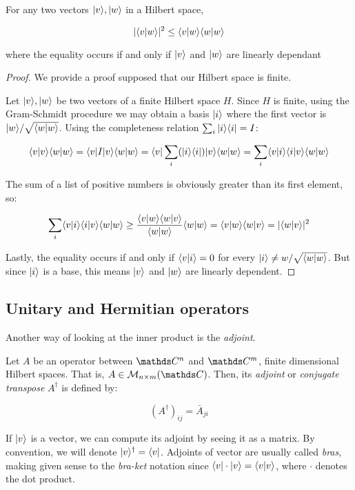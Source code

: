 \begin{corollary}
	For any two vectors $|v\rangle, |w\rangle$ in a Hilbert space,
	
	$$|\langle v|w\rangle|^2 \leq \langle v|w\rangle\langle w|w\rangle$$
	
	where the equality occurs if and only if $|v\rangle$ and $|w\rangle$ are linearly dependant
\end{corollary}
\begin{proof} 
	We provide a proof supposed that our Hilbert space is finite.
	
	Let $|v\rangle, |w\rangle$ be two vectors of a finite Hilbert space $H$. Since $H$ is finite, using the Gram-Schmidt procedure we may obtain a basis $|i\rangle$ where the first vector is $|w\rangle / \sqrt{\langle w|w\rangle}$. Using the completeness relation $\sum_i |i\rangle \langle i| = I$:
	
	$$\langle v|v\rangle \langle w|w\rangle = \langle v|I|v\rangle \langle w|w\rangle = \langle v| \sum_i (|i\rangle \langle i|) |v\rangle \langle w|w\rangle = \sum_i \langle v|i\rangle \langle i|v\rangle \langle w|w\rangle $$
	
	The sum of a list of positive numbers is obviously greater than its first element, so:
	
	$$ \sum_i \langle v|i\rangle \langle i|v\rangle \langle w|w\rangle \geq  \frac{\langle v|w\rangle \langle w|v\rangle}{\langle w|w\rangle} \langle w|w\rangle = \langle v|w\rangle \langle w|v\rangle  = | \langle w|v\rangle |^2 $$
	
	Lastly, the equality occurs if and only if $\langle v|i\rangle = 0$ for every $|i\rangle \neq w / \sqrt{\langle w|w\rangle}$. But since $|i\rangle$ is a base, this means $|v\rangle$ and $|w\rangle$ are linearly dependent.	
\end{proof}


\subsection{Unitary and Hermitian operators}


Another way of looking at the inner product is the \emph{adjoint}.

\begin{definition}
	Let $A$ be an operator between $\C^n$ and $\C^m$, finite dimensional Hilbert spaces. That is, $A \in \mathcal{M}_{n{\times}m}(\C)$. Then, its \emph{adjoint} or \emph{conjugate transpose} $A^\dagger$ is defined by:
	
	$$ (A^\dagger)_{ij} = \bar A_{ji} $$
\end{definition}

If $|v\rangle$ is a vector, we can compute its adjoint by seeing it as a matrix. By convention, we will denote $|v\rangle^\dagger = \langle v|$. Adjoints of vector are usually called \emph{bras}, making given sense to the \emph{bra-ket} notation since $\langle v| \cdot |v\rangle = \langle v|v\rangle$, where $\cdot$ denotes the dot product.

